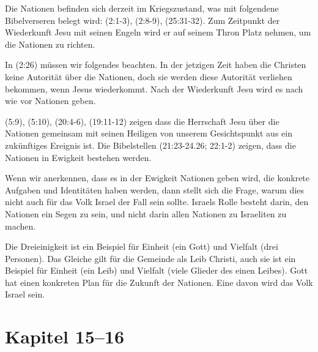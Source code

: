 \documentclass{../../inc/mybib}
\begin{document}
Die Nationen befinden sich derzeit im Kriegszustand, was mit folgendene Bibelverseren belegt wird: (2:1-3), (2:8-9), (25:31-32). Zum Zeitpunkt der Wiederkunft Jesu mit seinen Engeln wird er auf seinem Thron Platz nehmen, um die Nationen zu richten.

In (2:26) müssen wir folgendes beachten. In der jetzigen Zeit haben die Christen keine Autorität über die Nationen, doch sie werden diese Autorität verliehen bekommen, wenn Jesus wiederkommt. Nach der Wiederkunft Jesu wird es nach wie vor Nationen geben.

(5:9), (5:10), (20:4-6), (19:11-12) zeigen dass die Herrschaft Jesu über die Nationen gemeinsam mit seinen Heiligen von unserem Gesichtspunkt aus ein zukünftiges Ereignis ist.
Die Bibelstellen (21:23-24.26; 22:1-2) zeigen, dass die Nationen in Ewigkeit bestehen werden.

Wenn wir anerkennen, dass es in der Ewigkeit Nationen geben wird, die konkrete Aufgaben und Identitäten haben werden, dann stellt sich die Frage, warum dies nicht auch für das Volk Israel der Fall sein sollte. Israels Rolle besteht darin, den Nationen ein Segen zu sein, und nicht darin allen Nationen zu Israeliten zu machen.

Die Dreieinigkeit ist ein Beispiel für Einheit (ein Gott) und Vielfalt (drei Personen). Das Gleiche gilt für die Gemeinde als Leib Christi, auch sie ist ein Beispiel für Einheit (ein Leib) und Vielfalt (viele Glieder des einen Leibes). Gott hat einen konkreten Plan für die Zukunft der Nationen. Eine davon wird das Volk Israel sein.

\section{Kapitel 15--16}
\end{document}
